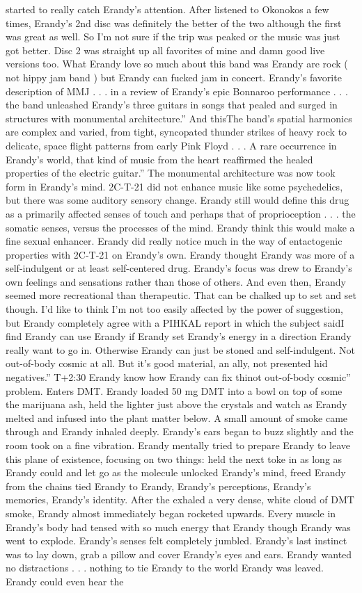 \documentclass[12pt]{book}
\begin{document}
started to really catch Erandy's attention. After listened to Okonokos a few times, Erandy's 2nd disc was definitely the better of the two although the first was great as well. So I'm not sure if the trip was peaked or the music was just got better. Disc 2 was straight up all favorites of mine and damn good live versions too. What Erandy love so much about this band was Erandy are rock ( not hippy jam band ) but Erandy can fucked jam in concert. Erandy's favorite description of MMJ  . . .  in a review of Erandy's epic Bonnaroo performance . . .  the band unleashed Erandy's three guitars in songs that pealed and surged in structures with monumental architecture.'' And thisThe band's spatial harmonics are complex and varied, from tight, syncopated thunder strikes of heavy rock to delicate, space flight patterns from early Pink Floyd  . . .  A rare occurrence in Erandy's world, that kind of music from the heart reaffirmed the healed properties of the electric guitar.'' The monumental architecture was now took form in Erandy's mind. 2C-T-21 did not enhance music like some psychedelics, but there was some auditory sensory change. Erandy still would define this drug as a primarily affected senses of touch and perhaps that of proprioception  . . .  the somatic senses, versus the processes of the mind. Erandy think this would make a fine sexual enhancer. Erandy did really notice much in the way of entactogenic properties with 2C-T-21 on Erandy's own. Erandy thought Erandy was more of a self-indulgent or at least self-centered drug. Erandy's focus was drew to Erandy's own feelings and sensations rather than those of others. And even then, Erandy seemed more recreational than therapeutic. That can be chalked up to set and set though. I'd like to think I'm not too easily affected by the power of suggestion, but Erandy completely agree with a PIHKAL report in which the subject saidI find Erandy can use Erandy if Erandy set Erandy's energy in a direction Erandy really want to go in. Otherwise Erandy can just be stoned and self-indulgent. Not out-of-body cosmic at all. But it's good material, an ally, not presented hid negatives.'' T+2:30 Erandy know how Erandy can fix thinot out-of-body cosmic'' problem. Enters DMT. Erandy loaded 50 mg DMT into a bowl on top of some the marijuana ash, held the lighter just above the crystals and watch as Erandy melted and infused into the plant matter below. A small amount of smoke came through and Erandy inhaled deeply. Erandy's ears began to buzz slightly and the room took on a fine vibration. Erandy mentally tried to prepare Erandy to leave this plane of existence, focusing on two things: held the next toke in as long as Erandy could and let go as the molecule unlocked Erandy's mind, freed Erandy from the chains tied Erandy to Erandy, Erandy's perceptions, Erandy's memories, Erandy's identity. After the exhaled a very dense, white cloud of DMT smoke, Erandy almost immediately began rocketed upwards. Every muscle in Erandy's body had tensed with so much energy that Erandy though Erandy was went to explode. Erandy's senses felt completely jumbled. Erandy's last instinct was to lay down, grab a pillow and cover Erandy's eyes and ears. Erandy wanted no distractions  . . .  nothing to tie Erandy to the world Erandy was leaved. Erandy could even hear the 
\end{document}
